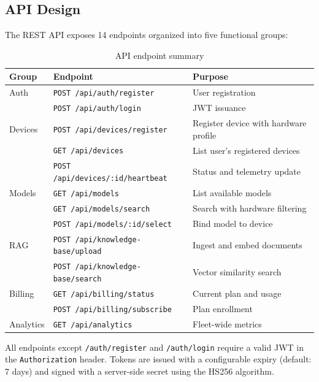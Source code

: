 \documentclass[12pt, letterpaper, twoside]{report}
\begin{document}
\subsection{API Design}
\label{subsec:api_design}

The REST API exposes 14 endpoints organized into five functional groups:

\begin{table}[H]
\centering
\caption{API endpoint summary}
\label{tab:api_endpoints}
\begin{tabularx}{\textwidth}{@{}llX@{}}
\toprule
\textbf{Group} & \textbf{Endpoint} & \textbf{Purpose} \\
\midrule
Auth    & \texttt{POST /api/auth/register} & User registration \\
        & \texttt{POST /api/auth/login} & JWT issuance \\
\midrule
Devices & \texttt{POST /api/devices/register} & Register device with hardware profile \\
        & \texttt{GET /api/devices} & List user's registered devices \\
        & \texttt{POST /api/devices/:id/heartbeat} & Status and telemetry update \\
\midrule
Models  & \texttt{GET /api/models} & List available models \\
        & \texttt{GET /api/models/search} & Search with hardware filtering \\
        & \texttt{POST /api/models/:id/select} & Bind model to device \\
\midrule
RAG     & \texttt{POST /api/knowledge-base/\allowbreak upload} & Ingest and embed documents \\
        & \texttt{POST /api/knowledge-base/\allowbreak search} & Vector similarity search \\
\midrule
Billing & \texttt{GET /api/billing/status} & Current plan and usage \\
        & \texttt{POST /api/billing/subscribe} & Plan enrollment \\
\midrule
Analytics & \texttt{GET /api/analytics} & Fleet-wide metrics \\
\bottomrule
\end{tabularx}
\end{table}

All endpoints except \texttt{/auth/register} and \texttt{/auth/login} require a valid JWT in the \texttt{Authorization} header. Tokens are issued with a configurable expiry (default: 7 days) and signed with a server-side secret using the HS256 algorithm.
\end{document}
